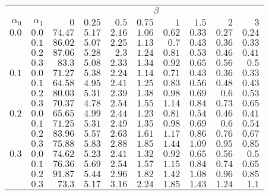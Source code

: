 \begin{tabular}{rr|rrrrrrrr}
\hline\hline
 && \multicolumn{8}{c}{$\beta$}\\
 $\alpha_0$ & $\alpha_1$ & $0$ & $0.25$ & $0.5$ & $0.75$ & $1$ & $1.5$ & $2$ & $3$ \\ 
 \hline
$0.0$ & $0.0$ & $74.47$ & $5.17$ & $2.16$ & $1.06$ & $0.62$ & $0.33$ & $0.27$ & $0.24$\\ 
 & $0.1$ & $86.02$ & $5.07$ & $2.25$ & $1.13$ & $0.7$ & $0.43$ & $0.36$ & $0.33$\\ 
 & $0.2$ & $87.06$ & $5.28$ & $2.3$ & $1.24$ & $0.81$ & $0.53$ & $0.46$ & $0.41$\\ 
 & $0.3$ & $83.3$ & $5.08$ & $2.33$ & $1.34$ & $0.92$ & $0.65$ & $0.56$ & $0.5$\\ 
\hline 
 $0.1$ & $0.0$ & $71.27$ & $5.38$ & $2.24$ & $1.14$ & $0.71$ & $0.43$ & $0.36$ & $0.33$\\ 
 & $0.1$ & $64.58$ & $4.95$ & $2.41$ & $1.25$ & $0.83$ & $0.56$ & $0.48$ & $0.43$\\ 
 & $0.2$ & $80.03$ & $5.31$ & $2.39$ & $1.38$ & $0.98$ & $0.69$ & $0.6$ & $0.53$\\ 
 & $0.3$ & $70.37$ & $4.78$ & $2.54$ & $1.55$ & $1.14$ & $0.84$ & $0.73$ & $0.65$\\ 
\hline 
 $0.2$ & $0.0$ & $65.65$ & $4.99$ & $2.44$ & $1.23$ & $0.81$ & $0.54$ & $0.46$ & $0.41$\\ 
 & $0.1$ & $71.25$ & $5.31$ & $2.49$ & $1.35$ & $0.98$ & $0.69$ & $0.6$ & $0.54$\\ 
 & $0.2$ & $83.96$ & $5.57$ & $2.63$ & $1.61$ & $1.17$ & $0.86$ & $0.76$ & $0.67$\\ 
 & $0.3$ & $75.88$ & $5.83$ & $2.88$ & $1.85$ & $1.44$ & $1.09$ & $0.95$ & $0.85$\\ 
\hline 
 $0.3$ & $0.0$ & $74.62$ & $5.23$ & $2.41$ & $1.32$ & $0.92$ & $0.65$ & $0.56$ & $0.5$\\ 
 & $0.1$ & $76.36$ & $5.69$ & $2.54$ & $1.57$ & $1.15$ & $0.84$ & $0.74$ & $0.65$\\ 
 & $0.2$ & $91.87$ & $5.44$ & $2.96$ & $1.82$ & $1.42$ & $1.08$ & $0.96$ & $0.85$\\ 
 & $0.3$ & $73.3$ & $5.17$ & $3.16$ & $2.24$ & $1.85$ & $1.43$ & $1.24$ & $1.1$\\ 
 \hline 
 \end{tabular}